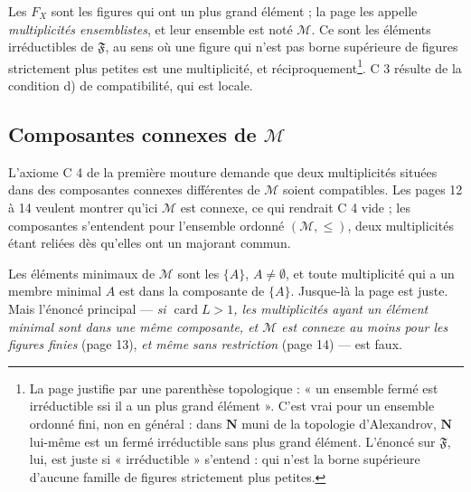 \documentclass[11pt,a4paper]{article}
\begin{document}
Les $F_{X}$ sont les figures qui ont un plus grand élément ; la page les
appelle \emph{multiplicités ensemblistes}, et leur ensemble est noté
$\mathcal{M}$. Ce sont les éléments irréductibles de $\mathfrak{F}$, au sens où
une figure qui n'est pas borne supérieure de figures strictement plus petites
est une multiplicité, et réciproquement\footnote{La page justifie par une
parenthèse topologique : « un ensemble fermé est irréductible ssi il a un plus
grand élément ». C'est vrai pour un ensemble ordonné fini, non en général : dans
$\mathbf{N}$ muni de la topologie d'Alexandrov, $\mathbf{N}$ lui-même est un
fermé irréductible sans plus grand élément. L'énoncé sur $\mathfrak{F}$, lui,
est juste si « irréductible » s'entend : qui n'est la borne supérieure d'aucune
famille de figures strictement plus petites.}. C 3 résulte de la condition d)
de compatibilité, qui est locale.

\subsection*{Composantes connexes de $\mathcal{M}$}

L'axiome C 4 de la première mouture demande que deux multiplicités situées dans
des composantes connexes différentes de $\mathcal{M}$ soient compatibles. Les
pages 12 à 14 veulent montrer qu'ici $\mathcal{M}$ est connexe, ce qui rendrait
C 4 vide ; les composantes s'entendent pour l'ensemble ordonné $(\mathcal{M},
\leq)$, deux multiplicités étant reliées dès qu'elles ont un majorant
commun.

Les éléments minimaux de $\mathcal{M}$ sont les $\{A\}$, $A \neq \emptyset$, et
toute multiplicité qui a un membre minimal $A$ est dans la composante de
$\{A\}$. Jusque-là la page est juste. Mais l'énoncé principal --- \emph{si
$\operatorname{card} L > 1$, les multiplicités ayant un élément minimal sont
dans une même composante, et $\mathcal{M}$ est connexe au moins pour les
figures finies} (page 13), \emph{et même sans restriction} (page 14) --- est
faux.
\end{document}
